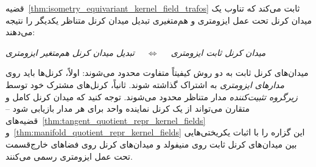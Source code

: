 قضیه~\ref{thm:isometry_equivariant_kernel_field_trafos} ثابت می‌کند
که تناوب یک میدان کرنل تحت عمل ایزومتری و هم‌متغیری تبدیل میدان کرنل متناظر یکدیگر را نتیجه می‌دهند:
\begin{center}\it
	میدان کرنل ثابت ایزومتری
	$\quad \Longleftrightarrow \quad$
	تبدیل میدان کرنل هم‌متغیر ایزومتری
\end{center}
میدان‌های کرنل ثابت به دو روش کیفیتاً متفاوت محدود می‌شوند:
اولاً، کرنل‌ها باید روی \emph{مدارهای ایزومتری} به اشتراک گذاشته شوند.
ثانیاً، کرنل‌های مشترک خود توسط \emph{زیرگروه تثبیت‌کننده} مدار متناظر محدود می‌شوند.
توجه کنید که میدان کرنل کامل و متقارن می‌تواند از یک کرنل نماینده واحد برای هر مدار بازیابی شود --
قضیه‌های~\ref{thm:tangent_quotient_repr_kernel_fields} و~\ref{thm:manifold_quotient_repr_kernel_fields} این گزاره را با اثبات یکریختی‌هایی بین میدان‌های کرنل ثابت روی منیفولد و میدان‌های کرنل روی فضاهای خارج‌قسمت تحت عمل ایزومتری رسمی می‌کنند.

